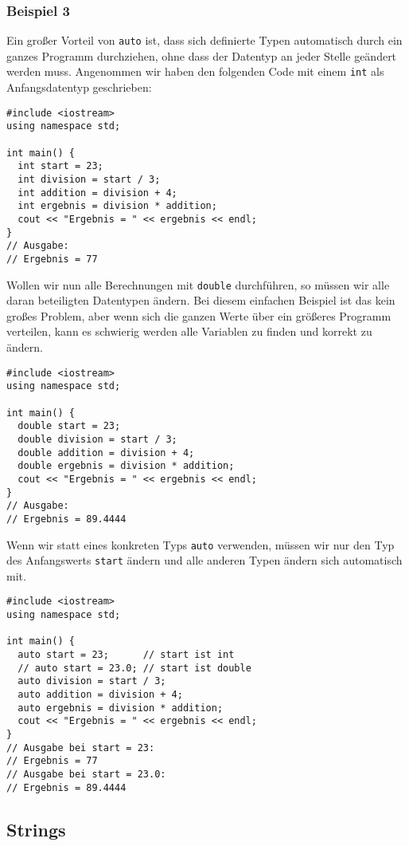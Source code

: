 \documentclass[11pt]{article}
\begin{document}
\subsubsection{Beispiel 3}
\label{sec-4-5-5}
Ein großer Vorteil von \verb~auto~ ist, dass sich definierte Typen
automatisch durch ein ganzes Programm durchziehen, ohne dass der
Datentyp an jeder Stelle geändert werden muss. Angenommen wir haben
den folgenden Code mit einem \verb~int~ als Anfangsdatentyp geschrieben:
\begin{verbatim}
#include <iostream>
using namespace std;

int main() {
  int start = 23;
  int division = start / 3;
  int addition = division + 4;
  int ergebnis = division * addition;
  cout << "Ergebnis = " << ergebnis << endl;
}
// Ausgabe:
// Ergebnis = 77
\end{verbatim}
Wollen wir nun alle Berechnungen mit \verb~double~ durchführen, so müssen
wir alle daran beteiligten Datentypen ändern. Bei diesem einfachen
Beispiel ist das kein großes Problem, aber wenn sich die ganzen Werte
über ein größeres Programm verteilen, kann es schwierig werden alle
Variablen zu finden und korrekt zu ändern.
\begin{verbatim}
#include <iostream>
using namespace std;

int main() {
  double start = 23;
  double division = start / 3;
  double addition = division + 4;
  double ergebnis = division * addition;
  cout << "Ergebnis = " << ergebnis << endl;
}
// Ausgabe:
// Ergebnis = 89.4444
\end{verbatim}
Wenn wir statt eines konkreten Typs \verb~auto~ verwenden, müssen wir nur
den Typ des Anfangswerts \verb~start~ ändern und alle anderen Typen
ändern sich automatisch mit.
\begin{verbatim}
#include <iostream>
using namespace std;

int main() {
  auto start = 23;      // start ist int
  // auto start = 23.0; // start ist double
  auto division = start / 3;
  auto addition = division + 4;
  auto ergebnis = division * addition;
  cout << "Ergebnis = " << ergebnis << endl;
}
// Ausgabe bei start = 23:
// Ergebnis = 77
// Ausgabe bei start = 23.0:
// Ergebnis = 89.4444
\end{verbatim}

\subsection{Strings}
\label{sec-4-6}
\end{document}
